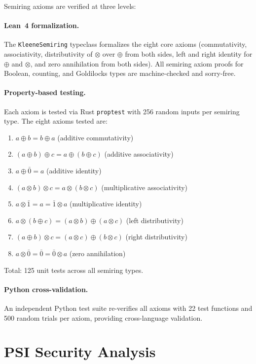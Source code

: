 \documentclass[11pt]{article}
\begin{document}
Semiring axioms are verified at three levels:

\paragraph{Lean~4 formalization.}
The \texttt{KleeneSemiring} typeclass formalizes
the eight core axioms (commutativity, associativity, distributivity of
$\otimes$ over $\oplus$ from both sides, left and right identity for
$\oplus$ and $\otimes$, and zero annihilation from both sides).
All semiring axiom proofs for Boolean, counting, and Goldilocks types
are machine-checked and sorry-free.

\paragraph{Property-based testing.}
Each axiom is tested via Rust \texttt{proptest} with 256 random
inputs per semiring type.
The eight axioms tested are:
\begin{enumerate}[nosep]
\item $a \oplus b = b \oplus a$ (additive commutativity)
\item $(a \oplus b) \oplus c = a \oplus (b \oplus c)$ (additive associativity)
\item $a \oplus \bar{0} = a$ (additive identity)
\item $(a \otimes b) \otimes c = a \otimes (b \otimes c)$ (multiplicative associativity)
\item $a \otimes \bar{1} = a = \bar{1} \otimes a$ (multiplicative identity)
\item $a \otimes (b \oplus c) = (a \otimes b) \oplus (a \otimes c)$ (left distributivity)
\item $(a \oplus b) \otimes c = (a \otimes c) \oplus (b \otimes c)$ (right distributivity)
\item $a \otimes \bar{0} = \bar{0} = \bar{0} \otimes a$ (zero annihilation)
\end{enumerate}
Total: 125 unit tests across all semiring types.

\paragraph{Python cross-validation.}
An independent Python test suite re-verifies all axioms with
22 test functions and 500 random trials per axiom, providing
cross-language validation.


\section{PSI Security Analysis}\label{app:psi-security}
\end{document}
